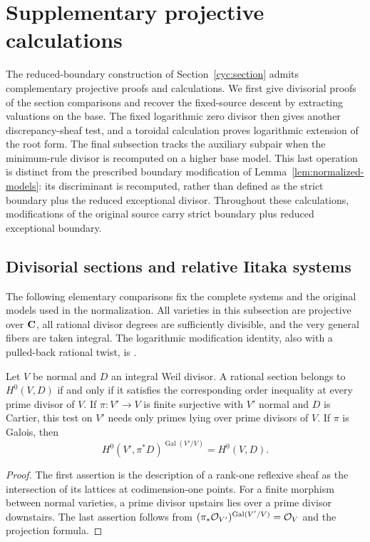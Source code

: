 \section{Supplementary projective calculations}
\label{p1logcbfalt:section}

The reduced-boundary construction of Section~\ref{cyc:section} admits
complementary projective proofs and calculations. We first give
divisorial proofs of the section comparisons and recover the
fixed-source descent by extracting valuations on the base. The fixed
logarithmic zero divisor then gives another discrepancy-sheaf test,
and a toroidal calculation proves logarithmic extension of the root
form. The final subsection tracks the auxiliary subpair when the
minimum-rule divisor is recomputed on a higher base model. This last
operation is distinct from the prescribed boundary modification of
Lemma~\ref{lem:normalized-models}: its discriminant is recomputed,
rather than defined as the strict boundary plus the reduced exceptional
divisor. Throughout these calculations, modifications of the original
source carry strict boundary plus reduced exceptional boundary.

\subsection{Divisorial sections and relative Iitaka systems}

The following elementary comparisons fix the complete systems and the
original models used in the normalization. All varieties in this
subsection are projective over $\mathbf C$, all rational divisor degrees are
sufficiently divisible, and the very general fibers are taken integral.
The logarithmic modification identity, also with a pulled-back rational
twist, is .

\begin{lemma}\label{p1logcbfalt:section-test}
Let \(V\) be normal and \(D\) an integral Weil divisor. A rational section
belongs to \(H^0(V,D)\) if and only if it satisfies the corresponding order
inequality at every prime divisor of \(V\). If \(\pi:V'\to V\) is finite
surjective with \(V'\) normal and \(D\) is Cartier, this test on \(V'\) needs
only primes lying over prime divisors of \(V\). If \(\pi\) is Galois, then
\[
H^0(V',\pi^*D)^{\operatorname{Gal}(V'/V)}=H^0(V,D).
\]
\end{lemma}

\begin{proof}
The first assertion is the description of a rank-one reflexive sheaf as
the intersection of its lattices at codimension-one points. For a finite
morphism between normal varieties, a prime divisor upstairs lies over a
prime divisor downstairs. The last assertion follows from
\((\pi_*\mathcal O_{V'})^{\operatorname{Gal}(V'/V)}=\mathcal O_V\) and the projection
formula.
\end{proof}

